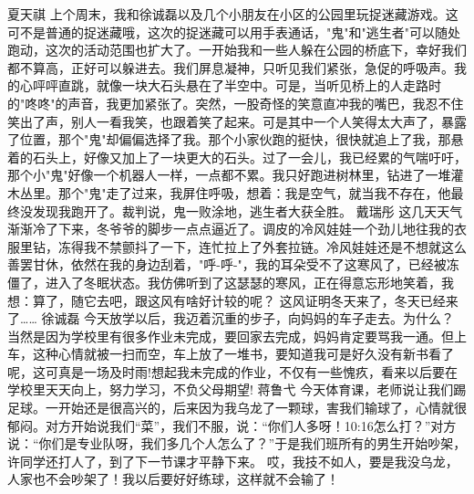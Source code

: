 {}\markdownRendererInterblockSeparator
{}夏天祺\markdownRendererInterblockSeparator
{}上个周末，我和徐诚磊以及几个小朋友在小区的公园里玩捉迷藏游戏。这可不是普通的捉迷藏哦，这次的捉迷藏可以用手表通话，"鬼"和"逃生者"可以随处跑动，这次的活动范围也扩大了。一开始我和一些人躲在公园的桥底下，幸好我们都不算高，正好可以躲进去。我们屏息凝神，只听见我们紧张，急促的呼吸声。我的心呯呯直跳，就像一块大石头悬在了半空中。可是，当听见桥上的人走路时的"咚咚"的声音，我更加紧张了。突然，一股奇怪的笑意直冲我的嘴巴，我忍不住笑出了声，别人一看我笑，也跟着笑了起来。可是其中一个人笑得太大声了，暴露了位置，那个"鬼"却偏偏选择了我。那个小家伙跑的挺快，很快就追上了我，那悬着的石头上，好像又加上了一块更大的石头。过了一会儿，我已经累的气喘吁吁，那个小"鬼"好像一个机器人一样，一点都不累。我只好跑进树林里，钻进了一堆灌木丛里。那个"鬼"走了过来，我屏住呼吸，想着：我是空气，就当我不存在，他最终没发现我跑开了。裁判说，鬼一败涂地，逃生者大获全胜。\markdownRendererInterblockSeparator
{}\markdownRendererInterblockSeparator
{}戴瑞彤\markdownRendererInterblockSeparator
{}这几天天气渐渐冷了下来，冬爷爷的脚步一点点逼近了。调皮的冷风娃娃一个劲儿地往我的衣服里钻，冻得我不禁颤抖了一下，连忙拉上了外套拉链。冷风娃娃还是不想就这么善罢甘休，依然在我的身边刮着，"呼-呼-"，我的耳朵受不了这寒风了，已经被冻僵了，进入了冬眠状态。我仿佛听到了这瑟瑟的寒风，正在得意忘形地笑着，我想：算了，随它去吧，跟这风有啥好计较的呢？\markdownRendererInterblockSeparator
{}这风证明冬天来了，冬天已经来了……\markdownRendererInterblockSeparator
{}\markdownRendererInterblockSeparator
{}徐诚磊\markdownRendererInterblockSeparator
{}今天放学以后，我迈着沉重的步子，向妈妈的车子走去。为什么？当然是因为学校里有很多作业未完成，要回家去完成，妈妈肯定要骂我一通。但上车，这种心情就被一扫而空，车上放了一堆书，要知道我可是好久没有新书看了呢，这可真是一场及时雨!想起我未完成的作业，不仅有一些愧疚，看来以后要在学校里天天向上，努力学习，不负父母期望!\markdownRendererInterblockSeparator
{}\markdownRendererInterblockSeparator
{}蒋鲁弋\markdownRendererInterblockSeparator
{}今天体育课，老师说让我们踢足球。一开始还是很高兴的，后来因为我乌龙了一颗球，害我们输球了，心情就很郁闷。对方开始说我们“菜”，我们不服，说：“你们人多呀！10:16怎么打？”对方说：“你们是专业队呀，我们多几个人怎么了？”于是我们班所有的男生开始吵架，许同学还打人了，到了下一节课才平静下来。\markdownRendererInterblockSeparator
{}哎，我技不如人，要是我没乌龙，人家也不会吵架了！我以后要好好练球，这样就不会输了！\markdownRendererInterblockSeparator
